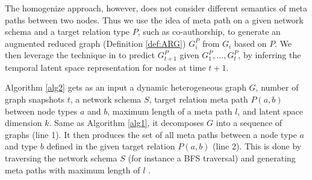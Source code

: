 The homogenize approach, however, does not consider different semantics of meta paths between two nodes. Thus we use the idea of meta path \cite{sun2011pathsim} on a given network schema and a target relation type $P$, such as co-authorship, to generate an augmented reduced graph (Definition \ref{def:ARG}) $G^P_i$ from $G_i$ based on $P$.  We then leverage the technique in \cite{Zhu2016} to predict $G^P_{t+1}$ given $G^P_1, ..., G^P_t$, by inferring the temporal latent space representation for nodes at time $t+1$.

Algorithm \ref{alg2} gets as an input a dynamic heterogeneous graph $G$, number of graph snapshots $t$, a network schema $S$, target relation meta path $P(a,b)$ between node types $a$ and $b$, maximum length of a meta path $l$, and latent space dimension $k$. Same as Algorithm \ref{alg1}, it decomposes $G$ into a sequence of graphs (line 1). It then produces the set of all meta paths between a node type $a$ and type $b$ defined in the given target relation $P(a,b)$ (line 2). This is done by traversing the network schema $S$ (for instance a BFS traversal) and generating meta paths with maximum length of $l$ .

